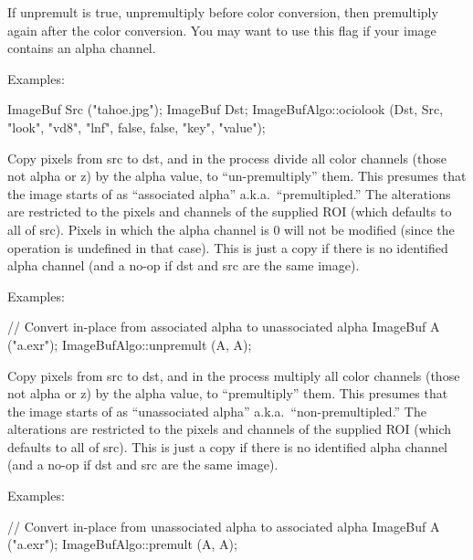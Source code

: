 If {\cf unpremult} is {\cf true}, unpremultiply before color conversion,
then premultiply again after the color conversion.  You may want to use
this flag if your image contains an alpha channel.

\smallskip
\noindent Examples:
\begin{code}
    ImageBuf Src ("tahoe.jpg");
    ImageBuf Dst;
    ImageBufAlgo::ociolook (Dst, Src, "look", "vd8", "lnf", false, false,
                            "key", "value");
\end{code}
\apiend


 
Copy pixels from {\cf src} to {\cf dst}, and in the process 
divide all color channels (those not alpha or z) 
by the alpha value, to ``un-premultiply'' them.  This presumes that the
image starts of as ``associated alpha'' a.k.a.\ ``premultipled.''  The
alterations are restricted to the pixels and channels of the supplied
ROI (which defaults to all of {\cf src}).  Pixels in which the alpha
channel is 0 will not be modified (since the operation is undefined in
that case).  This is just a copy if there is no identified alpha channel
(and a no-op if {\cf dst} and {\cf src} are the same image).

\smallskip
\noindent Examples:
\begin{code}
    // Convert in-place from associated alpha to unassociated alpha
    ImageBuf A ("a.exr");
    ImageBufAlgo::unpremult (A, A);
\end{code}
\apiend

 
Copy pixels from {\cf src} to {\cf dst}, and in the process 
multiply all color channels (those not alpha or z) 
by the alpha value, to ``premultiply'' them.  This presumes that the
image starts of as ``unassociated alpha'' a.k.a.\ ``non-premultipled.''
The alterations are restricted to the pixels and channels of the
supplied ROI (which defaults to all of {\cf src}).  This is just a copy
if there is no identified alpha channel
(and a no-op if {\cf dst} and {\cf src} are the same image).

\smallskip
\noindent Examples:
\begin{code}
    // Convert in-place from unassociated alpha to associated alpha
    ImageBuf A ("a.exr");
    ImageBufAlgo::premult (A, A);
\end{code}
\apiend



